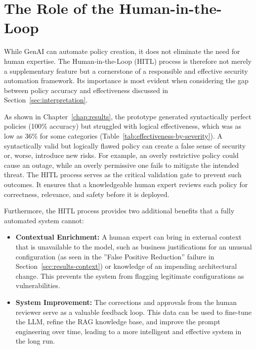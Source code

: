 \section{The Role of the Human-in-the-Loop}
\label{sec:hitl_in_action}

While GenAI can automate policy creation, it does not eliminate the need for human expertise. The Human-in-the-Loop (HITL) process is therefore not merely a supplementary feature but a cornerstone of a responsible and effective security automation framework. Its importance is most evident when considering the gap between policy accuracy and effectiveness discussed in Section~\ref{sec:interpretation}.

As shown in Chapter~\ref{chap:results}, the prototype generated syntactically perfect policies (100\% accuracy) but struggled with logical effectiveness, which was as low as 36\% for some categories (Table~\ref{tab:effectiveness-by-severity}). A syntactically valid but logically flawed policy can create a false sense of security or, worse, introduce new risks. For example, an overly restrictive policy could cause an outage, while an overly permissive one fails to mitigate the intended threat. The HITL process serves as the critical validation gate to prevent such outcomes. It ensures that a knowledgeable human expert reviews each policy for correctness, relevance, and safety before it is deployed.

Furthermore, the HITL process provides two additional benefits that a fully automated system cannot:
\begin{itemize}
    \item \textbf{Contextual Enrichment:} A human expert can bring in external context that is unavailable to the model, such as business justifications for an unusual configuration (as seen in the ''False Positive Reduction'' failure in Section~\ref{sec:results-context}) or knowledge of an impending architectural change. This prevents the system from flagging legitimate configurations as vulnerabilities.
    \item \textbf{System Improvement:} The corrections and approvals from the human reviewer serve as a valuable feedback loop. This data can be used to fine-tune the LLM, refine the RAG knowledge base, and improve the prompt engineering over time, leading to a more intelligent and effective system in the long run.
\end{itemize}

